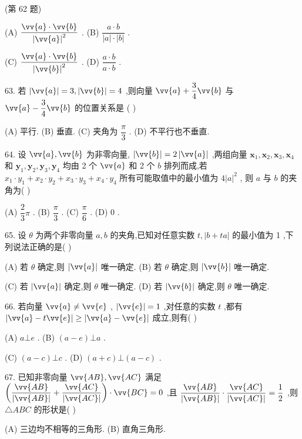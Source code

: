 (第 62 题)

(A) $\dfrac{\vv{a} \cdot  \vv{b}}{{\left| \vv{a}\right| }^{2}}$ . (B) $\dfrac{a \cdot  b}{\left| a\right|  \cdot  \left| b\right| }$ .

(C) $\dfrac{\vv{a} \cdot  \vv{b}}{{\left| \vv{b}\right| }^{2}}$ . (D) $\dfrac{a \cdot  b}{a \cdot  b}$ .

63. 若 $\left| \vv{a}\right|  = 3,\left| \vv{b}\right|  = 4$ ,则向量 $\vv{a} + \dfrac{3}{4}\vv{b}$ 与 $\vv{a} - \dfrac{3}{4}\vv{b}$ 的位置关系是 (   )

(A) 平行. (B) 垂直. (C) 夹角为 $\dfrac{\pi }{3}$ . (D) 不平行也不垂直.

64. 设 $\vv{a},\vv{b}$ 为非零向量, $\left| \vv{b}\right|  = 2\left| \vv{a}\right|$ ,两组向量 ${\mathbf{x}}_{1},{\mathbf{x}}_{2},{\mathbf{x}}_{3},{\mathbf{x}}_{4}$ 和 ${\mathbf{y}}_{1},{\mathbf{y}}_{2},{\mathbf{y}}_{3},{\mathbf{y}}_{4}$ 均由 2 个 $\vv{a}$ 和 2 个 $b$ 排列而成,若 ${x}_{1} \cdot  {y}_{1} + {x}_{2} \cdot  {y}_{2} + {x}_{3} \cdot  {y}_{3} + {x}_{4} \cdot  {y}_{4}$ 所有可能取值中的最小值为 $4{\left| a\right| }^{2}$ , 则 $a$ 与 $b$ 的夹角为(   )

(A) $\dfrac{2}{3}\pi$ . (B) $\dfrac{\pi }{3}$ . (C) $\dfrac{\pi }{6}$ . (D) 0 .

65. 设 $\theta$ 为两个非零向量 $a,b$ 的夹角,已知对任意实数 $t,\left| {b + {ta}}\right|$ 的最小值为 1 ,下列说法正确的是(   )

(A) 若 $\theta$ 确定,则 $\left| \vv{a}\right|$ 唯一确定. (B) 若 $\theta$ 确定,则 $\left| \vv{b}\right|$ 唯一确定.

(C) 若 $\left| \vv{a}\right|$ 确定,则 $\theta$ 唯一确定. (D) 若 $\left| \vv{b}\right|$ 确定,则 $\theta$ 唯一确定.

66. 若向量 $\vv{a} \neq  \vv{e}$ , $\left| \vv{e}\right|  = 1$ ,对任意的实数 $t$ ,都有 $\left| {\vv{a} - t\vv{e}}\right|  \geq  \left| {\vv{a} - \vv{e}}\right|$ 成立,则有(   )

(A) $a\bot e$ . (B) $\left( {a - e}\right) \bot a$ .

(C) $\left( {a - c}\right) \bot c$ . (D) $\left( {a + c}\right)  \bot  \left( {a - c}\right)$ .

67. 已知非零向量 $\vv{AB},\vv{AC}$ 满足 $\left( {\dfrac{\vv{AB}}{\left| \vv{AB}\right| } + \dfrac{\vv{AC}}{\left| \vv{AC}\right| }}\right)  \cdot  \vv{BC} = 0$ ,且 $\dfrac{\vv{AB}}{\left| \vv{AB}\right| } \cdot  \dfrac{\vv{AC}}{\left| \vv{AC}\right| } = \dfrac{1}{2}$ ,则 $\bigtriangleup  {ABC}$ 的形状是(   )

(A) 三边均不相等的三角形. (B) 直角三角形.


